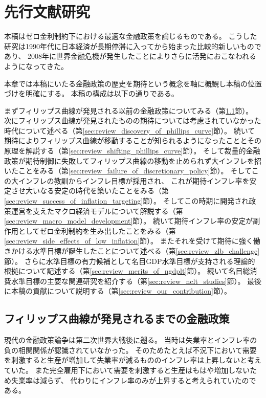 
\chapter{先行文献研究}
\label{chap:literature_review}

本稿はゼロ金利制約下における最適な金融政策を論じるものである。
こうした研究は1990年代に日本経済が長期停滞に入ってから始まった比較的新しいものであり、
2008年に世界金融危機が発生したことによりさらに活発におこなわれるようになってきた。

本章では本稿にいたる金融政策の歴史を期待という概念を軸に概観し本稿の位置づけを明確にする。
本稿の構成は以下の通りである。

まずフィリップス曲線が発見される以前の金融政策についてみる（第\ref{sec:review_before_phillips_curve}節）。
次にフィリップス曲線が発見されたものの期待については考慮されていなかった時代について述べる（第\ref{sec:review_discovery_of_phillips_curve}節）。
続いて期待によりフィリップス曲線が移動することが知られるようになったこととその原理を解説する（第\ref{sec:review_shifting_phillips_curve}節）。
そして裁量的金融政策が期待制御に失敗してフィリップス曲線の移動を止められず大インフレを招いたことをみる（第\ref{sec:review_failure_of_discretionary_policy}節）。
そしてこの大インフレの教訓からインフレ目標が採用され、
これが期待インフレ率を安定させ大いなる安定の時代を築いたことをみる（第\ref{sec:review_success_of_inflation_targeting}節）。
そしてこの時期に開発され政策運営を支えたマクロ経済モデルについて解説する（第\ref{sec:review_macro_model_development}節）。
続いて期待インフレ率の安定が副作用としてゼロ金利制約を生み出したことをみる（第\ref{sec:review_side_effects_of_low_inflation}節）。
またそれを受けて期待に強く働きかける水準目標が誕生したことについて述べる（第\ref{sec:review_zlb_challenge}節）。
さらに水準目標の有力候補として名目GDP水準目標が支持される理論的根拠について記述する（第\ref{sec:review_merits_of_ngdplt}節）。
続いて名目総消費水準目標の主要な関連研究を紹介する（第\ref{sec:review_nclt_studies}節）。
最後に本稿の貢献について説明する（第\ref{sec:review_our_contribution}節）。

\section{フィリップス曲線が発見されるまでの金融政策}
\label{sec:review_before_phillips_curve}

現代の金融政策論争は第二次世界大戦後に遡る\parencite[金融政策の歴史的概観については][などを参照]{ClaridaGaliGertler1999,Woodford2009}。
当時は失業率とインフレ率の負の相関関係が認識されていなかった。
そのためたとえば不況下において需要を刺激すると生産が増加して失業率が減るもののインフレ率は上昇しないと考えていた。
また完全雇用下において需要を刺激すると生産はもはや増加しないため失業率は減らず、
代わりにインフレ率のみが上昇すると考えられていたのである\parencite[この時代の政策思想については][に詳しい]{Friedman1968,GoodfriendKing1997}。

